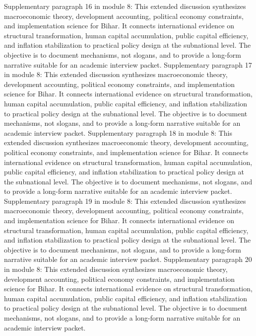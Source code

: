 \documentclass[preprint,12pt]{elsarticle}
\begin{document}
Supplementary paragraph 16 in module 8: This extended discussion synthesizes macroeconomic theory, development accounting, political economy constraints, and implementation science for Bihar. It connects international evidence on structural transformation, human capital accumulation, public capital efficiency, and inflation stabilization to practical policy design at the subnational level. The objective is to document mechanisms, not slogans, and to provide a long-form narrative suitable for an academic interview packet.
Supplementary paragraph 17 in module 8: This extended discussion synthesizes macroeconomic theory, development accounting, political economy constraints, and implementation science for Bihar. It connects international evidence on structural transformation, human capital accumulation, public capital efficiency, and inflation stabilization to practical policy design at the subnational level. The objective is to document mechanisms, not slogans, and to provide a long-form narrative suitable for an academic interview packet.
Supplementary paragraph 18 in module 8: This extended discussion synthesizes macroeconomic theory, development accounting, political economy constraints, and implementation science for Bihar. It connects international evidence on structural transformation, human capital accumulation, public capital efficiency, and inflation stabilization to practical policy design at the subnational level. The objective is to document mechanisms, not slogans, and to provide a long-form narrative suitable for an academic interview packet.
Supplementary paragraph 19 in module 8: This extended discussion synthesizes macroeconomic theory, development accounting, political economy constraints, and implementation science for Bihar. It connects international evidence on structural transformation, human capital accumulation, public capital efficiency, and inflation stabilization to practical policy design at the subnational level. The objective is to document mechanisms, not slogans, and to provide a long-form narrative suitable for an academic interview packet.
Supplementary paragraph 20 in module 8: This extended discussion synthesizes macroeconomic theory, development accounting, political economy constraints, and implementation science for Bihar. It connects international evidence on structural transformation, human capital accumulation, public capital efficiency, and inflation stabilization to practical policy design at the subnational level. The objective is to document mechanisms, not slogans, and to provide a long-form narrative suitable for an academic interview packet.
\end{document}
